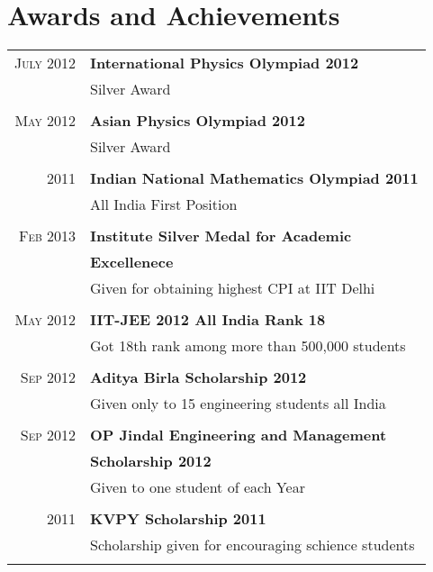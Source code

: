 \documentclass[10pt]{article} %
\begin{document}
{\begin{minipage}[t]{0.5\textwidth}
\section{Awards and Achievements} 
\begin{tabular}{rl}
\textsc{July 2012} & \textbf{International Physics Olympiad 2012}\\
& Silver Award\\\\
\textsc{May 2012} & \textbf{Asian Physics Olympiad 2012}\\
& Silver Award\\\\
\textsc{2011} & \textbf{Indian National Mathematics Olympiad 2011}\\
& All India First Position \\\\
\textsc{Feb 2013} & \textbf{Institute Silver Medal for Academic}\\ &  {\bf Excellenece }\\
& Given for obtaining highest CPI at IIT Delhi\\\\
\textsc{May 2012} & \textbf{IIT-JEE 2012 All India Rank 18}\\
& Got 18th rank among more than 500,000 students\\\\
\textsc{Sep 2012} & \textbf{Aditya Birla Scholarship 2012}\\
& Given only to 15 engineering students all India\\\\
\textsc{Sep 2012} & \textbf{OP Jindal Engineering and Management }\\ & \textbf{ Scholarship 2012}\\
& Given to one student of each Year\\\\
\textsc{2011} & \textbf{KVPY Scholarship 2011}\\
& Scholarship given for encouraging schience students \\\\
\end{tabular}\\[10pt]

\end{minipage} %
\hfill
\begin{minipage}[t]{0.44\textwidth} %
\vspace{0pt} %


\end{minipage}}
\end{document}
